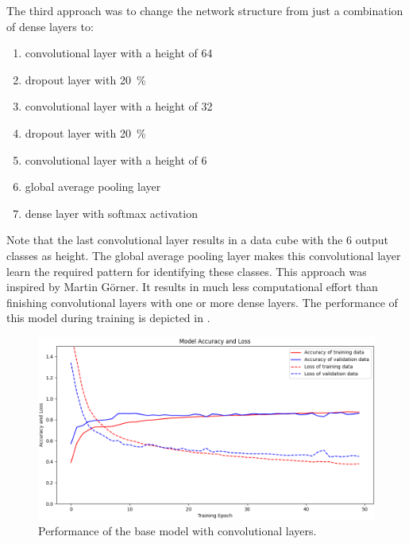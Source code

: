 The third approach was to change the network structure from just a combination of dense layers to:
\begin{enumerate}
\item convolutional layer with a height of 64
\item dropout layer with \SI{20}{\percent}
\item convolutional layer with a height of 32
\item dropout layer with \SI{20}{\percent}
\item convolutional layer with a height of 6
\item global average pooling layer
\item dense layer with softmax activation
\end{enumerate}
Note that the last convolutional layer results in a data cube with the 6 output classes as height. The global average pooling layer makes this convolutional layer learn the required pattern for identifying these classes. This approach was inspired by Martin Görner\autocite{Google:withoutPHD}. It results in much less computational effort than finishing convolutional layers with one or more dense layers. The performance of this model during training is depicted in .
\begin{figure}[htpb]
\centering
\includegraphics[width=\linewidth]{DidiConvFinal}
\caption{Performance of the base model with convolutional layers.}
\label{myfig:DidiConvFinal}
\end{figure}

